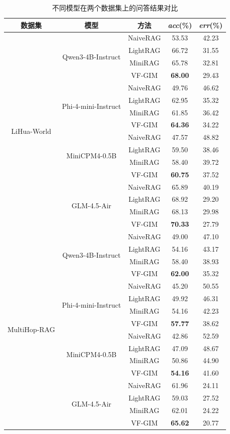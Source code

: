 \documentclass[promaster, vlined]{DissertUESTC}
\begin{document}
\begin{table}[!ht]
\centering
\caption{不同模型在两个数据集上的问答结果对比}
\label{tab:vfgim_qa}
\begin{tabular*}{\textwidth}{@{\extracolsep{\fill}}ccccc}
\toprule
\textbf{数据集} & \textbf{模型} & \textbf{方法} & \textit{acc}(\%) & \textit{err}(\%) \\
\midrule
\multirow{16}{*}{LiHua-World}
& \multirow{4}{*}{Qwen3-4B-Instruct }
& NaiveRAG & 53.53 & 42.23 \\
& & LightRAG & 66.72 & 31.55 \\
& & MiniRAG  & 65.78 & 32.81 \\
& & VF-GIM   & \textbf{68.00} & 29.43 \\
\cmidrule{2-5}
& \multirow{4}{*}{Phi-4-mini-Instruct}
& NaiveRAG & 49.76 & 46.62 \\
& & LightRAG & 62.95 & 35.32 \\
& & MiniRAG  & 61.85 & 36.42 \\
& & VF-GIM   & \textbf{64.36} & 34.22 \\
\cmidrule{2-5}
& \multirow{4}{*}{MiniCPM4-0.5B}
& NaiveRAG & 47.57 & 48.82 \\
& & LightRAG & 59.50 & 38.46 \\
& & MiniRAG  & 58.40 & 39.72 \\
& & VF-GIM   & \textbf{60.75} & 37.52 \\
\cmidrule{2-5}
& \multirow{4}{*}{GLM-4.5-Air}
& NaiveRAG & 65.89 & 40.19 \\
& & LightRAG & 68.92 & 29.20 \\
& & MiniRAG  & 68.13 & 29.98 \\
& & VF-GIM   & \textbf{70.33} & 27.79 \\
\midrule
\multirow{16}{*}{MultiHop-RAG}
& \multirow{4}{*}{Qwen3-4B-Instruct}
& NaiveRAG & 49.00 & 47.10 \\
& & LightRAG & 54.16 & 43.17 \\
& & MiniRAG  & 58.40 & 38.93 \\
& & VF-GIM   & \textbf{62.00} & 35.32 \\
\cmidrule{2-5}
& \multirow{4}{*}{Phi-4-mini-Instruct}
& NaiveRAG & 45.20 & 50.55 \\
& & LightRAG & 49.92 & 46.31 \\
& & MiniRAG  & 54.16 & 42.23 \\
& & VF-GIM   & \textbf{57.77} & 38.62 \\
\cmidrule{2-5}
& \multirow{4}{*}{MiniCPM4-0.5B}
& NaiveRAG & 42.86 & 52.59 \\
& & LightRAG & 47.09 & 48.67 \\
& & MiniRAG  & 50.86 & 44.90 \\
& & VF-GIM   & \textbf{54.16} & 41.60 \\
\cmidrule{2-5}
& \multirow{4}{*}{GLM-4.5-Air}
& NaiveRAG & 61.96 & 24.11 \\
& & LightRAG & 59.03 & 27.52 \\
& & MiniRAG  & 62.01 & 24.22 \\
& & VF-GIM   & \textbf{65.62} & 20.77 \\
\bottomrule
\end{tabular*}
\end{table}
\end{document}
